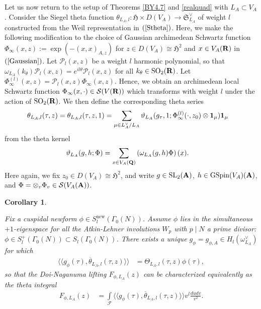 \documentclass{amsart}
\newtheorem{corollary}[theorem]{Corollary}
\theoremstyle{definition}
\theoremstyle{definition}
\theoremstyle{definition}
\begin{document}
Let us now return to the setup of Theorems \ref{BY4.7} and \ref{realquad} with $L_A \subset V_A$. 
Consider the Siegel theta function $\theta_{L_A, l}: \mathfrak{H} \times D(V_A) \longrightarrow \mathfrak{S}_{L_A}^{\vee}$ of weight $l$ constructed 
from the Weil representation in $(\ref{Stheta})$. Here, we make the following modification to the choice of 
Gaussian archimedean Schwartz function $\Phi_{\infty}(x, z) := \exp(-(x,x)_{A,z})$ for $z \in D(V_A) \cong \mathfrak{H}^2$ 
and $x \in V_A({\bf{R}})$ in $(\ref{Gaussian})$. Let $\mathcal{P}_l(x, z)$ be a weight $l$ harmonic polynomial, so that 
$\omega_{L_A}(k_{\theta}) \mathcal{P}_l(x, z) = e^{il \theta} \mathcal{P}_l(x, z)$ for all $k_{\theta} \in \operatorname{SO}_2({\bf{R}})$.
Let $\Phi_{\infty}^{(l)}(x, z) = \mathcal{P}_l(x, z) \Phi_{\infty}(x, z)$. Hence, we obtain an archimedean local Schwartz function 
$\Phi_{\infty}(x, \cdot) \in \mathcal{S}(V({\bf{R}}))$ which transforms with weight $l$ under the action of $\operatorname{SO}_2({\bf{R}})$.
We then define the corresponding theta series 
\begin{align*} \theta_{L_A, l}(\tau, z) = \theta_{L_A, l}(\tau, z, 1) 
&= \sum\limits_{\mu \in L_A^{\vee}/L_A} \vartheta_{L_A}(g_{\tau}, 1; \Phi^{(l)}_{\infty}(\cdot, z_0) \otimes {\bf{1}}_{\mu}) {\bf{1}}_{\mu}\end{align*}
from the theta kernel 
\begin{align*} \vartheta_{L_A}(g, h; \Phi) &= \sum\limits_{x \in V_A({\bf{Q}})} \left( \omega_{L_A}(g, h) \Phi \right)(x). \end{align*}
Here again, we fix $z_0 \in D(V_A) \cong \mathfrak{H}^2$, 
and write $g \in \operatorname{SL}_2({\bf{A}})$, $h \in \operatorname{GSpin}(V_A)({\bf{A}})$, and $\Phi = \otimes_v \Phi_v \in \mathcal{S}(V_A({\bf{A}}))$. 
 
\begin{corollary}\label{existence}

Fix a cuspidal newform $\phi \in S_{l}^{\operatorname{new}}(\Gamma_0(N))$. Assume $\phi$ lies in the simultaneous $+1$-eigenspace
for all the Atkin-Lehner involutions $W_p$ with $p \mid N$ a prime divisor: $\phi \in S_{l}^+(\Gamma_0(N)) \subset S_{l}(\Gamma_0(N))$.
There exists a unique $g_{\phi} = g_{\phi, A} \in H_{l}(\omega_{L_A}^{\vee})$ for which 
\begin{align}\label{DNrel} \langle \langle g_{\phi}(\tau), \overline{\theta}_{L_A, l}(\tau, z) \rangle \rangle 
&= \Theta_{L_A, l}(\tau, z) \phi  (\tau),\end{align}
so that the Doi-Naganuma lifting $F_{\phi, L_A}(z)$ can be characterized equivalently as the theta integral 
\begin{align*} F_{\phi, L_A}(z) &= \int\limits_{\mathcal{F}} 
\langle \langle g_{\phi}(\tau), \overline{\theta}_{L_A, l}(\tau, z) \rangle \rangle v^l  \frac{du dv}{v^2}. \end{align*} \end{corollary}
\end{document}
